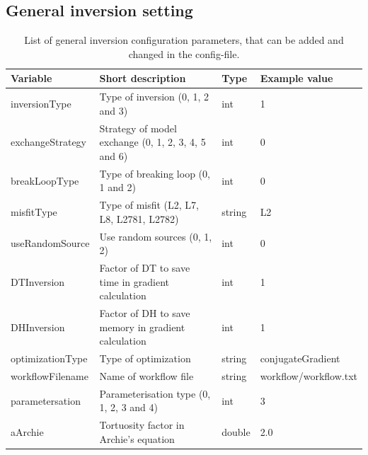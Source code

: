 \documentclass[pdftex,a4paper,parskip,listof=totoc,bibliography=totoc,onehalfspacing,12pt]{scrreprt}
\begin{document}
\subsection{General inversion setting}
\begin{table}[h!]
\caption[List of general inversion configuration parameters.]{List of general inversion configuration parameters, that can be added and changed in the config-file.}\label{tab:config_general_inversion_setting}
\centering
\begin{adjustbox}{width=1\textwidth,center=\textwidth}
	\begin{tabular}{llll}
	\toprule
         Variable                 & Short description                                                   & Type   & Example value \\
	\midrule                 
         inversionType               & Type of inversion (0, 1, 2 and 3)                                                    & int & 1  \\
         exchangeStrategy               & Strategy of model exchange (0, 1, 2, 3, 4, 5 and 6)                                                    & int & 0  \\
         breakLoopType               & Type of breaking loop (0, 1 and 2)                                                    & int & 0  \\
         misfitType               & Type of misfit (L2, L7, L8, L2781, L2782)                                                    & string & L2  \\
         useRandomSource & Use random sources (0, 1, 2) & int & \num{0} \\
         DTInversion              & Factor of DT to save time in gradient calculation   &  int   & 1 \\
         DHInversion              & Factor of DH to save memory in gradient calculation   &  int   & 1 \\
         optimizationType         & Type of optimization                                     & string & conjugateGradient \\
         workflowFilename         & Name of workflow file                                               & string & workflow/workflow.txt \\
         parametersation            & Parameterisation type (0, 1, 2, 3 and 4) &  int   & 3  \\
         aArchie            & Tortuosity factor in Archie's equation &  double   & 2.0  \\

\end{tabular}
\end{adjustbox}
\end{table}
\end{document}
